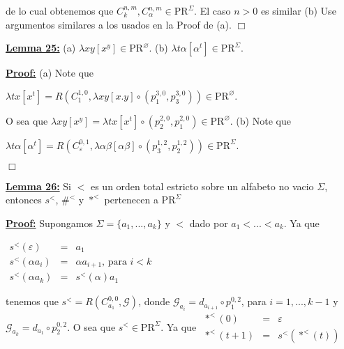   de lo cual obtenemos que \(C_{k}^{n,m},C_{\alpha }^{n,m}\in \mathrm{PR} ^{\Sigma }\). El caso \(n >0\) es similar
  (b) Use argumentos similares a los usados en la Proof de (a). \(\Box\)


  \textbf{\underline{Lemma 25:}}
  (a) \(\lambda xy\left[ x^{y}\right] \in \mathrm{PR}^{\varnothing }\).
  (b) \(\lambda t\alpha \left[ \alpha ^{t}\right] \in \mathrm{PR} ^{\Sigma }\).


  \textbf{\underline{Proof:}} (a) Note que

  \(\displaystyle \lambda tx\left[ x^{t}\right] =R\left( C_{1}^{1,0},\lambda xy\left[ x.y \right] \circ \left( p_{1}^{3,0},p_{3}^{3,0}\right) \right) \in \mathrm{PR} ^{\varnothing }. \)

  O sea que \(\lambda xy\left[ x^{y}\right] =\lambda tx\left[ x^{t}\right] \circ \left( p_{2}^{2,0},p_{1}^{2,0}\right) \in \mathrm{PR}^{\varnothing }\).
  (b) Note que

  \(\displaystyle \lambda t\alpha \left[ \alpha ^{t}\right] =R\left( C_{\varepsilon }^{0,1},\lambda \alpha \beta \left[ \alpha \beta \right] \circ \left( p_{3}^{1,2},p_{2}^{1,2}\right) \right) \in \mathrm{PR}^{\Sigma }. \)

  \(\Box\)


  \textbf{\underline{Lemma 26:}} Si \(< \) es un orden total estricto sobre un alfabeto no vacio \( \Sigma \), entonces \(s^{< }\), \(\#^{< }\) y \(\ast ^{< }\) pertenecen a \(\mathrm{PR} ^{\Sigma }\)

  \textbf{\underline{Proof:}} Supongamos \(\Sigma =\{a_{1},...,a_{k}\}\) y \(< \) dado por \(a_{1}< ...< a_{k}\). Ya que

  \(\displaystyle \begin{array}{rcl} s^{< }(\varepsilon ) & =& a_{1} \\ s^{< }(\alpha a_{i}) & =& \alpha a_{i+1}\text{, para }i< k \\ s^{< }(\alpha a_{k}) & =& s^{< }(\alpha )a_{1} \end{array} \)

  tenemos que \(s^{< }=R\left( C_{a_{1}}^{0,0},\mathcal{G}\right) \), donde \( \mathcal{G}_{a_{i}}=d_{a_{i+1}}\circ p_{1}^{0,2}\), para \(i=1,...,k-1\) y \( \mathcal{G}_{a_{k}}=d_{a_{1}}\circ p_{2}^{0,2}.\) O sea que \(s^{< }\in \mathrm{ PR}^{\Sigma }.\) Ya que
  \(\displaystyle \begin{array}{rcl} \ast ^{< }(0) & =& \varepsilon \\ \ast ^{< }(t+1) & =& s^{< }(\ast ^{< }(t)) \end{array} \)

